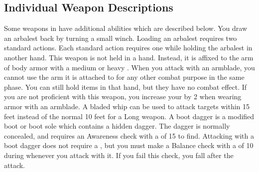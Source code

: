     \subsection{Individual Weapon Descriptions}
        Some weapons in  have additional abilities which are described below.
         You draw an arbalest back by turning a small winch. Loading an arbalest requires two standard actions.
        Each standard action requires one  while holding the arbalest in another hand.
         This weapon is not held in a hand.
        Instead, it is affixed to the arm of body armor with a medium or heavy .
        When you attack with an armblade, you cannot use the arm it is attached to for any other combat purpose in the same phase.
        You can still hold items in that hand, but they have no combat effect.
        If you are not proficient with this weapon, you increase your  by 2 when wearing armor with an armblade.
         A bladed whip can be used to attack targets within 15 feet instead of the normal 10 feet for a Long weapon.
         A boot dagger is a modified boot or boot sole which contains a hidden dagger.
        The dagger is normally concealed, and requires an Awareness check with a  of 15 to find.
        Attacking with a boot dagger does not require a , but you must make a Balance check with a  of 10 during whenever you attack with it.
        If you fail this check, you fall \prone after the attack.

